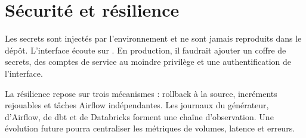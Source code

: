 \section{Sécurité et résilience}
Les secrets sont injectés par l'environnement et ne sont jamais reproduits dans le dépôt. L'interface écoute sur . En production, il faudrait ajouter un coffre de secrets, des comptes de service au moindre privilège et une authentification de l'interface.

La résilience repose sur trois mécanismes : rollback à la source, incréments rejouables et tâches Airflow indépendantes. Les journaux du générateur, d'Airflow, de dbt et de Databricks forment une chaîne d'observation. Une évolution future pourra centraliser les métriques de volumes, latence et erreurs.

